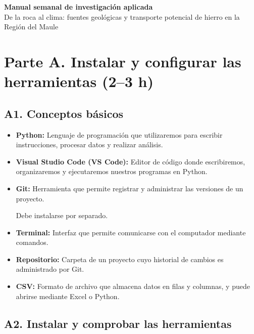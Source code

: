 \documentclass[11pt,a4paper]{article}
\begin{document}
\begin{center}{\LARGE\bfseries Manual semanal de investigación aplicada}\\[4pt]{\large De la roca al clima: fuentes geológicas y transporte potencial de hierro en la Región del Maule}\\[8pt]\end{center}

\section{Parte A. Instalar y configurar las herramientas (2--3 h)}

\subsection*{A1. Conceptos básicos}

\begin{itemize}

    \item \textbf{Python:} Lenguaje de programación que
    utilizaremos para escribir instrucciones, procesar
    datos y realizar análisis.

    \item \textbf{Visual Studio Code (VS Code):} Editor
    de código donde escribiremos, organizaremos y
    ejecutaremos nuestros programas en Python.

    \item \textbf{Git:} Herramienta que permite registrar
    y administrar las versiones de un proyecto.

    Debe instalarse por separado.

    \item \textbf{Terminal:} Interfaz que permite
    comunicarse con el computador mediante comandos.

    \item \textbf{Repositorio:} Carpeta de un proyecto
    cuyo historial de cambios es administrado por Git.

    \item \textbf{CSV:} Formato de archivo que almacena
    datos en filas y columnas, y puede abrirse
    mediante Excel o Python.

\end{itemize}

\subsection*{A2. Instalar y comprobar las herramientas}
\end{document}
